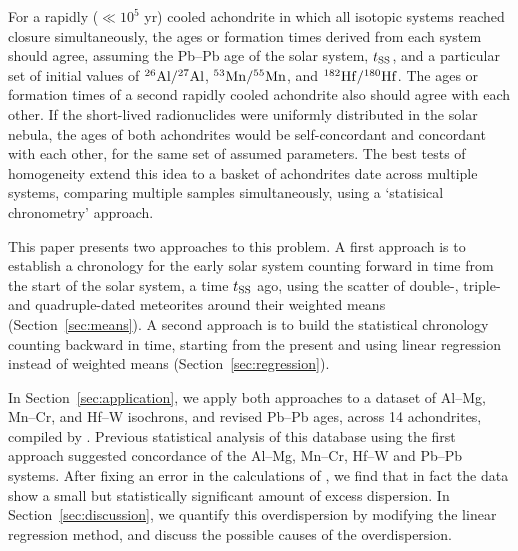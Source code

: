 For a rapidly ($\ll 10^5$ yr) cooled achondrite in which all isotopic
systems reached closure simultaneously, the ages or formation times
derived from each system should agree, assuming the Pb--Pb age of the
solar system, $t_{\rm SS}$, and a particular set of initial values of
${}^{26}{\rm Al}/{}^{27}{\rm Al}$, ${}^{53}{\rm Mn}/{}^{55}{\rm Mn}$,
and ${}^{182}{\rm Hf}/{}^{180}{\rm Hf}$.  The ages or formation times
of a second rapidly cooled achondrite also should agree with each
other.  If the short-lived radionuclides were uniformly distributed in
the solar nebula, the ages of both achondrites would be
self-concordant and concordant with each other, for the same set of
assumed parameters.  The best tests of homogeneity extend this idea to
a basket of achondrites date across multiple systems, comparing
multiple samples simultaneously, using a `statisical chronometry'
approach.\medskip

This paper presents two approaches to this problem.  A first approach
is to establish a chronology for the early solar system counting
forward in time from the start of the solar system, a time $t_{\rm
  SS}$ ago, using the scatter of double-, triple- and quadruple-dated
meteorites around their weighted means (Section~\ref{sec:means}).  A
second approach is to build the statistical chronology counting
backward in time, starting from the present and using linear
regression instead of weighted means
(Section~\ref{sec:regression}).\medskip

In Section~\ref{sec:application}, we apply both approaches to a
dataset of Al--Mg, Mn--Cr, and Hf--W isochrons, and revised Pb--Pb ages, across 14
achondrites, compiled by \citet{desch2023a,desch2023b}. Previous
statistical analysis of this database using the first approach
suggested concordance of the Al--Mg, Mn--Cr, Hf--W and Pb--Pb systems.
After fixing an error in the calculations of
\citet{desch2023a,desch2023b}, we find that in fact the data show a
small but statistically significant amount of excess dispersion.  In
Section~\ref{sec:discussion}, we quantify this overdispersion by
modifying the linear regression method, and discuss the possible
causes of the overdispersion.

